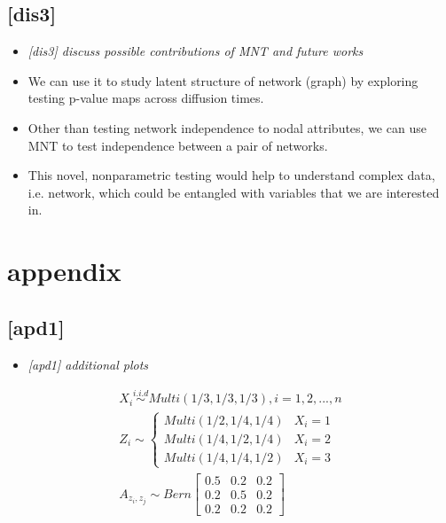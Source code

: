 \documentclass[12pt]{article}
\theoremstyle{definition}
\begin{document}
\subsection{[dis3]}
\begin{itemize}
	\item {\it  [dis3] discuss possible contributions of MNT and future works  \/}
\end{itemize}

\begin{itemize}
	\item We can use it to study latent structure of network (graph) by exploring testing p-value maps across diffusion times.
	\item Other than testing network independence to nodal attributes, we can use MNT to test independence between a pair of networks.  
	\item This novel, nonparametric testing would help to understand complex data, i.e. network, which could be entangled with variables that we are interested in. 
\end{itemize}	





\newpage
\appendix
\section{appendix}

\subsection{[apd1]}
\begin{itemize}
	\item {\it  [apd1] additional plots   \/}
\end{itemize}


\begin{equation}
\begin{gathered}
X_{i} \overset{i.i.d}{\sim} Multi(1/3, 1/3, 1/3), i = 1,2, ... , n \\ 
Z_{i}  \sim  \left\{  \begin{array}{ccc} Multi(1/2, 1/4, 1/4) & X_{i} = 1 \\ Multi(1/4, 1/2, 1/4) & X_{i} = 2 \\ Multi(1/4, 1/4, 1/2) & X_{i} = 3  \end{array} \right. \\
A_{z_{i}, z_{j}} \sim Bern \left[  \begin{array}{ccc}   0.5 & 0.2 &  0.2  \\ 0.2 & 0.5 & 0. 2  \\ 0.2 & 0.2 & 0.2  \end{array}  \right]
\end{gathered}
\end{equation}
\end{document}

